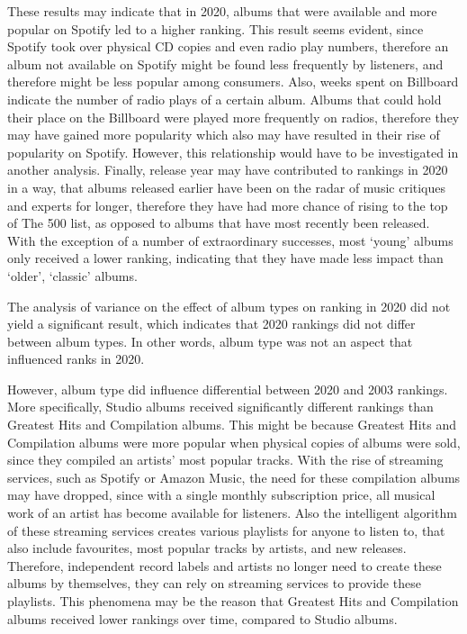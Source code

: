 \documentclass[
]{article}
\begin{document}
These results may indicate that in 2020, albums that were available and
more popular on Spotify led to a higher ranking. This result seems
evident, since Spotify took over physical CD copies and even radio play
numbers, therefore an album not available on Spotify might be found less
frequently by listeners, and therefore might be less popular among
consumers. Also, weeks spent on Billboard indicate the number of radio
plays of a certain album. Albums that could hold their place on the
Billboard were played more frequently on radios, therefore they may have
gained more popularity which also may have resulted in their rise of
popularity on Spotify. However, this relationship would have to be
investigated in another analysis. Finally, release year may have
contributed to rankings in 2020 in a way, that albums released earlier
have been on the radar of music critiques and experts for longer,
therefore they have had more chance of rising to the top of The 500
list, as opposed to albums that have most recently been released. With
the exception of a number of extraordinary successes, most `young'
albums only received a lower ranking, indicating that they have made
less impact than `older', `classic' albums.

The analysis of variance on the effect of album types on ranking in 2020
did not yield a significant result, which indicates that 2020 rankings
did not differ between album types. In other words, album type was not
an aspect that influenced ranks in 2020.

However, album type did influence differential between 2020 and 2003
rankings. More specifically, Studio albums received significantly
different rankings than Greatest Hits and Compilation albums. This might
be because Greatest Hits and Compilation albums were more popular when
physical copies of albums were sold, since they compiled an artists'
most popular tracks. With the rise of streaming services, such as
Spotify or Amazon Music, the need for these compilation albums may have
dropped, since with a single monthly subscription price, all musical
work of an artist has become available for listeners. Also the
intelligent algorithm of these streaming services creates various
playlists for anyone to listen to, that also include favourites, most
popular tracks by artists, and new releases. Therefore, independent
record labels and artists no longer need to create these albums by
themselves, they can rely on streaming services to provide these
playlists. This phenomena may be the reason that Greatest Hits and
Compilation albums received lower rankings over time, compared to Studio
albums.
\end{document}
